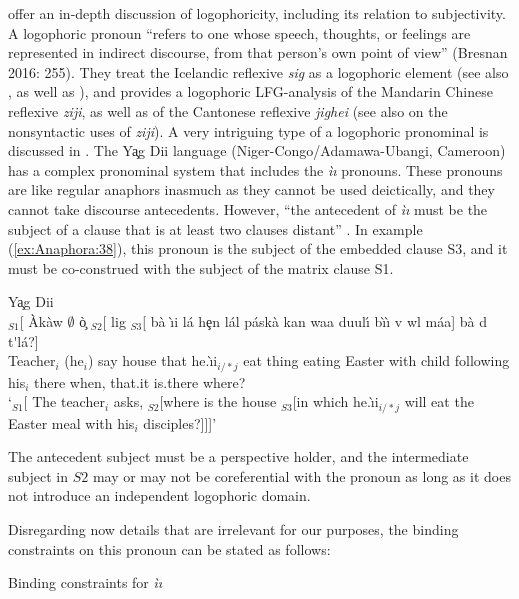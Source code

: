 \documentclass[output=paper,hidelinks]{langscibook}
\begin{document}
\citet{BresnanEtAl2016} offer an in-depth discussion of logophoricity, including its relation to subjectivity. A logophoric pronoun ``refers to one whose speech, thoughts, or feelings are represented in indirect discourse, from that person's own point of view'' (Bresnan 2016: 255). They treat the Icelandic reflexive \emph{sig} as a logophoric element (see also \citealt{Maling84}, as well as \citet{Strahan:LFG09,Strahan2011}), and \citet{Lam2021-rq} provides a logophoric LFG-analysis of the Mandarin Chinese reflexive \emph{ziji}, as well as of the Cantonese reflexive \emph{jighei} (see also \citealt{10.2307/20100748} on the nonsyntactic uses of \emph{ziji}). A very intriguing type of a logophoric pronominal is discussed in \citet{Dalrymple2015}. The Y\c{a}g Dii language (Niger-Congo/Adamawa-Ubangi, Cameroon) has a complex pronominal system that includes the \emph{ìı} pronouns. These pronouns are like regular anaphors inasmuch as they cannot be used deictically, and they cannot take discourse antecedents. However, ``the antecedent of \emph{ìı} must be the subject of a clause that is at least two clauses distant'' \citep[1090]{Dalrymple2015}. In example (\ref{ex:Anaphora:38}), this pronoun is the subject of the embedded clause S3, and it must be co-construed with the subject of the matrix clause S1.

\ea\label{ex:Anaphora:38}  Y\c{a}g Dii \citep[1091]{Dalrymple2015}\\
\gll
$_{S1}$[ \`Ak\`aw $\emptyset$
\c{\`o} $_{S2}$[ lig $_{S3}$[ b\`a {{\`\i}i} lá h\c{e}n lál{\acutetextbari} pásk\`a kan
    waa duul{\'\i} b{\`\i}{\`\i} v{\textbaru}
  w{\textbaru}l{\acutetextbari} máa] b\`a d{\textbari}
  t\'{\textepsilon}lá?]\\
{} Teacher$_i$ (he$_i$) say {} house {} that {he.{{\`\i}i}}$_{i/*j}$ eat
thing eating Easter with child following his$_i$ {\PL} there when,
that.it is.there where?\\
\glt `$_{S1}$[ The teacher$_i$ asks, $_{S2}$[where is the
house $_{S3}$[in which {he.{{\`\i}i}$_{i/*j}$} will eat the Easter meal with his$_i$
disciples?]]]'\z

\noindent The antecedent subject must be a perspective holder, and the intermediate subject in $S2$ may or may not be coreferential with the pronoun as long as it does not introduce an independent logophoric domain.

Disregarding now details that are irrelevant for our purposes, the binding constraints on this pronoun can be stated as follows:

\ea\label{ex:Anaphora:39} Binding constraints for \emph{ìı} \citep[1117]{Dalrymple2015}
\z
\end{document}
